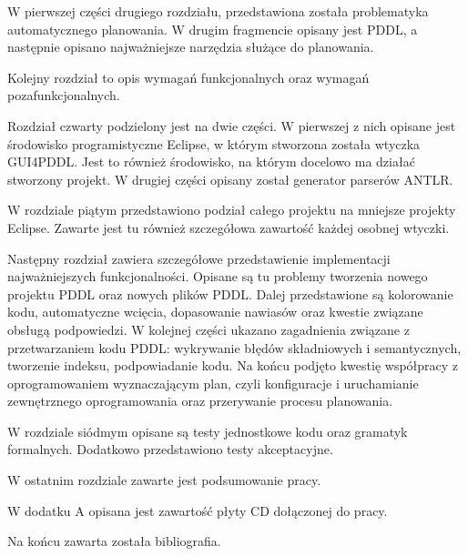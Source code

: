 W pierwszej części drugiego rozdziału, przedstawiona została problematyka automatycznego planowania. W drugim fragmencie opisany jest PDDL, a następnie opisano najważniejsze narzędzia służące do planowania.

Kolejny rozdział to opis wymagań funkcjonalnych oraz wymagań pozafunkcjonalnych.

Rozdział czwarty podzielony jest na dwie części. W pierwszej z nich opisane jest środowisko programistyczne Eclipse, w którym stworzona została wtyczka GUI4PDDL. Jest to również środowisko, na którym docelowo ma działać stworzony projekt. W drugiej części opisany został generator parserów ANTLR.

W rozdziale piątym przedstawiono podział całego projektu na mniejsze projekty Eclipse. Zawarte jest tu również szczegółowa zawartość każdej osobnej wtyczki.

Następny rozdział zawiera szczegółowe przedstawienie implementacji najważniejszych funkcjonalności. Opisane są tu problemy tworzenia nowego projektu PDDL oraz nowych plików PDDL. Dalej przedstawione są kolorowanie kodu, automatyczne wcięcia, dopasowanie nawiasów oraz kwestie związane obsługą podpowiedzi. W kolejnej części ukazano zagadnienia związane z przetwarzaniem kodu PDDL: wykrywanie błędów składniowych i semantycznych, tworzenie indeksu, podpowiadanie kodu. Na końcu podjęto kwestię współpracy z oprogramowaniem wyznaczającym plan, czyli konfiguracje i uruchamianie zewnętrznego oprogramowania oraz przerywanie procesu planowania.

W rozdziale siódmym opisane są testy jednostkowe kodu oraz gramatyk formalnych. Dodatkowo przedstawiono testy akceptacyjne.

W ostatnim rozdziale zawarte jest podsumowanie pracy.

W dodatku A opisana jest zawartość płyty CD dołączonej do pracy.

Na końcu zawarta została bibliografia.
